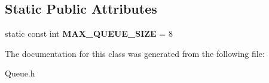 \subsection*{Static Public Attributes}
\begin{DoxyCompactItemize}
\item 
\hypertarget{class_queue_aaf3eed0540baaf6609b48910aacc7133}{static const int {\bfseries M\+A\+X\+\_\+\+Q\+U\+E\+U\+E\+\_\+\+S\+I\+Z\+E} = 8}\label{class_queue_aaf3eed0540baaf6609b48910aacc7133}

\end{DoxyCompactItemize}


The documentation for this class was generated from the following file\+:\begin{DoxyCompactItemize}
\item 
Queue.\+h\end{DoxyCompactItemize}

